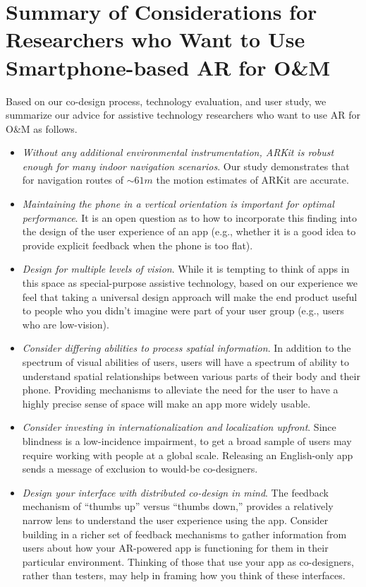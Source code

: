 \documentclass[chi_draft]{sigchi}
\newcommand{\OM}{O\&M\xspace}
\begin{document}
\section{Summary of Considerations for Researchers who Want to Use Smartphone-based AR for \OM}

Based on our co-design process, technology evaluation, and user study, we summarize our advice for assistive technology researchers who want to use AR for \OM as follows.

\begin{itemize}
\item \emph{Without any additional environmental instrumentation, ARKit is robust enough for many indoor navigation scenarios}.  Our study demonstrates that for navigation routes of $\sim61m$ the motion estimates of ARKit are accurate.
\item \emph{Maintaining the phone in a vertical orientation is important for optimal performance}.  It is an open question as to how to incorporate this finding into the design of the user experience of an app (e.g., whether it is a good idea to provide explicit feedback when the phone is too flat).
\item \emph{Design for multiple levels of vision}.  While it is tempting to think of apps in this space as special-purpose assistive technology, based on our experience we feel that taking a universal design approach will make the end product useful to people who you didn't imagine were part of your user group (e.g., users who are low-vision).
\item \emph{Consider differing abilities to process spatial information}.  In addition to the spectrum of visual abilities of users, users will have a spectrum of ability to understand spatial relationships between various parts of their body and their phone.  Providing mechanisms to alleviate the need for the user to have a highly precise sense of space will make an app more widely usable.
\item \emph{Consider investing in internationalization and localization upfront}.  Since blindness is a low-incidence impairment, to get a broad sample of users may require working with people at a global scale.  Releasing an English-only app sends a message of exclusion to would-be co-designers.

\item \emph{Design your interface with distributed co-design in mind}.  The feedback mechanism of ``thumbs up'' versus ``thumbs down,'' provides a relatively narrow lens to understand the user experience using the app.  Consider building in a richer set of feedback mechanisms to gather information from users about how your AR-powered app is functioning for them in their particular environment.  Thinking of those that use your app as co-designers, rather than testers, may help in framing how you think of these interfaces.


\end{itemize}
\end{document}
